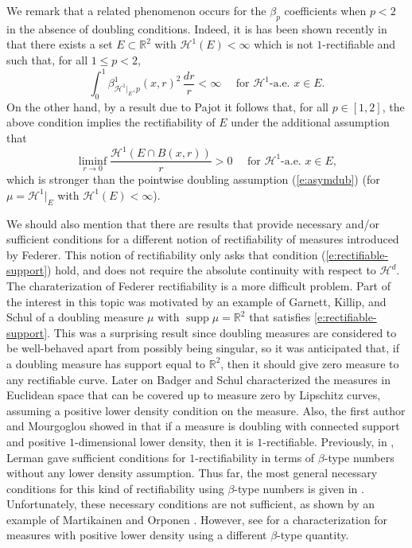 \documentclass[11pt]{amsart}
\newcommand{\R}{{\mathbb R}}       %
\newcommand{\HH}{{\mathcal H}}
\newcommand{\rf}[1]{{(\ref{#1})}}
\newcommand{\supp}{\operatorname{supp}}
\newcommand{\Bl}{\color{blue}}
\theoremstyle{definition}
\theoremstyle{remark}
\numberwithin{equation}{section}
\newcommand{\xavi}[1]{}%
\begin{document}
\xavi{I added this paragraph}
We remark that a related phenomenon occurs for the $\beta_p$ coefficients when $p<2$ in the absence of doubling conditions. Indeed, it is
has been shown recently in \cite{Tolsa-betap} that there exists a set $E\subset \R^2$ with $\HH^1(E)<\infty$ which is not $1$-rectifiable and such that, for all $1\leq p<2$, 
\begin{equation*}
	\int_0^1\beta_{\HH^1|_E,p}^1(x,r)^2\,\frac{dr}r<\infty\quad \mbox{ for $\HH^1$-a.e. $x\in E$}.
	\end{equation*}
On the other hand, by a result due to Pajot \cite{Pajot97} it follows that, for all $p\in[1,2]$, the above condition implies the  rectifiability of
$E$ under the additional assumption that $$\liminf_{r\to0} \frac{\HH^1(E\cap B(x,r))}r>0
\quad \mbox{ for $\HH^1$-a.e. $x\in E$}, $$ which is stronger than the pointwise doubling assumption \rf{e:asymdub} (for  $\mu=\HH^1|_E$ with $\HH^1(E)<\infty$).



We should also mention that there are results that provide necessary and/or sufficient conditions for 
a different notion of rectifiability of measures introduced by Federer. This notion of rectifiability only asks that condition \rf{e:rectifiable-support} hold, and does not require the absolute continuity with respect to $\HH^d$. The charaterization of Federer rectifiability is a more difficult
problem. Part of the interest in this topic was motivated by an example of Garnett, Killip, and Schul \cite{GKS10} of a doubling measure $\mu$ with $\supp \mu=\R^{2}$ that satisfies \eqref{e:rectifiable-support}. This was a surprising result since doubling measures are considered to be well-behaved apart from possibly being singular, so it was anticipated that, if a doubling measure has support equal to $\R^{2}$, then it should give zero measure to any rectifiable curve. 
Later on  Badger and Schul \cite{BS16}  characterized the measures in Euclidean space that can be covered up to measure zero by Lipschitz curves, assuming a positive lower density condition on the measure.  Also, the first author and Mourgoglou showed in \cite{AM16}
that if a measure is doubling with connected support and positive $1$-dimensional lower density, then it is $1$-rectifiable. Previously, in \cite{Ler03}, Lerman gave sufficient conditions for $1$-rectifiability in terms of $\beta$-type numbers without any lower density assumption. Thus far, the most general necessary conditions for this kind of rectifiability using $\beta$-type numbers is given in \cite{BS15}. Unfortunately, these necessary conditions are not sufficient, as shown by an example of Martikainen and Orponen \cite{MO16}. However, see \cite{BS17} for a characterization for measures with positive lower density using a different $\beta$-type quantity. 
\end{document}
